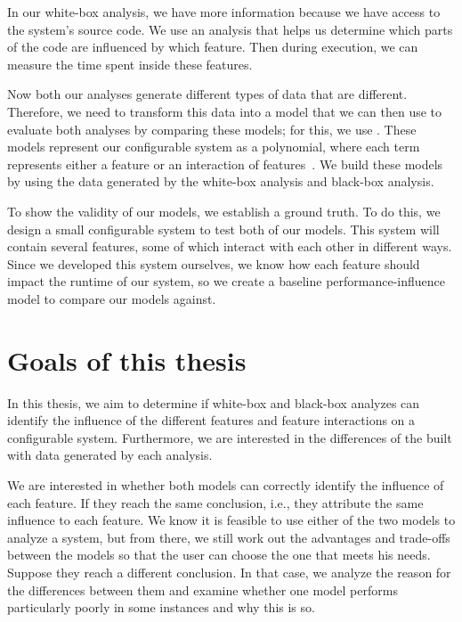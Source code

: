 In our white-box analysis, we have more information because we have access to the system's source code.
We use an analysis that helps us determine which parts of the code are influenced by which feature.
Then during execution, we can measure the time spent inside these features.

Now both our analyses generate different types of data that are different. 
Therefore, we need to transform this data into a model that we can then use to evaluate both analyses by comparing these models; 
for this, we use \perfInfluenceModel. These models represent our configurable system as a polynomial, 
where each term represents either a feature or an interaction of features~\cite{Performance-influence-models-for-highly-configurable-systems}.
We build these models by using the data generated by the white-box analysis and black-box analysis. 

To show the validity of our models, we establish a ground truth. To do this, we design a small configurable system to test both of our 
models. This system will contain several features, some of which interact with each other in different ways. 
Since we developed this system ourselves, we know how each feature should impact the runtime of our system, so we create
a baseline performance-influence model to compare our models against.


\section{Goals of this thesis}
In this thesis, we aim to determine if white-box and black-box analyzes can identify the influence of the different features and 
feature interactions on a configurable system.
Furthermore, we are interested in the differences of the  built with data generated by each analysis.

We are interested in whether both models can correctly identify the influence of each feature.
If they reach the same conclusion, i.e., they attribute the same influence to each feature. 
We know it is feasible to use either of the two models to analyze a system, but from there, 
we still work out the advantages and trade-offs between the models so that the user can choose the one that meets his needs.
Suppose they reach a different conclusion. In that case, we analyze the reason for the 
differences between them and examine whether one model performs particularly poorly in some instances and why this is so.

